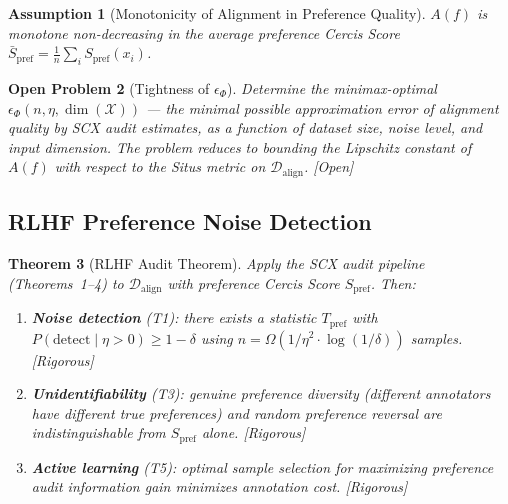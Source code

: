 \documentclass[12pt,a4paper]{article}
\newtheorem{theorem}{Theorem}[section]
\newtheorem{assumption}[theorem]{Assumption}
\newtheorem{openproblem}[theorem]{Open Problem}
\newcommand{\rigorous}{\textcolor{green!50!black}{\small\textsf{[Rigorous]}}}
\newcommand{\openquest}{\textcolor{red!70!black}{\small\textsf{[Open]}}}
\newcommand{\cX}{\mathcal{X}}
\newcommand{\cD}{\mathcal{D}}
\begin{document}
\begin{assumption}[Monotonicity of Alignment in Preference Quality]
\label{ass:monotonicity}
$A(f)$ is monotone non-decreasing in the average preference Cercis Score
$\bar{S}_{\mathrm{pref}} = \frac1n\sum_i S_{\mathrm{pref}}(x_i)$.
\end{assumption}

\begin{openproblem}[Tightness of $\epsilon_\Phi$]
\label{prob:epsilon-phi}
Determine the minimax-optimal $\epsilon_\Phi(n,\eta,\dim(\cX))$ — the minimal
possible approximation error of alignment quality by SCX audit estimates, as a
function of dataset size, noise level, and input dimension.  The problem
reduces to bounding the Lipschitz constant of $A(f)$ with respect to the Situs
metric on $\cD_{\mathrm{align}}$.  \openquest
\end{openproblem}

\subsection{RLHF Preference Noise Detection}

\begin{theorem}[RLHF Audit Theorem]
\label{thm:pref-noise}
Apply the SCX audit pipeline (Theorems~1--4) to $\cD_{\mathrm{align}}$ with
preference Cercis Score $S_{\mathrm{pref}}$.  Then:
\begin{enumerate}[label=(\roman*)]
    \item \textbf{Noise detection} (T1): there exists a statistic
          $T_{\mathrm{pref}}$ with $P(\text{detect}\mid\eta>0)\geq1-\delta$
          using $n=\Omega(1/\eta^2\cdot\log(1/\delta))$ samples.  \rigorous
    \item \textbf{Unidentifiability} (T3): genuine preference diversity
          (different annotators have different true preferences) and random
          preference reversal are indistinguishable from $S_{\mathrm{pref}}$
          alone.  \rigorous
    \item \textbf{Active learning} (T5): optimal sample selection for
          maximizing preference audit information gain minimizes annotation
          cost.  \rigorous
\end{enumerate}
\end{theorem}
\end{document}
